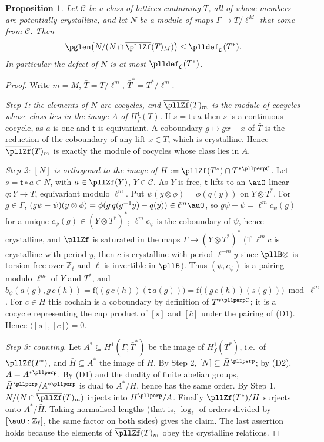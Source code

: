 \documentclass[10pt]{amsart}
\newtheorem{proposition}[theorem]{Proposition}
\theoremstyle{definition}
\theoremstyle{remark}
\newcommand{\Z}{\mathbb Z}
\begin{document}
\begin{proposition}\label{pll:dual}
Let $\mathcal C$ be a class of lattices containing $T$, all of whose members are potentially
crystalline, and let $N$ be a module of maps $\Gamma\to T/\ell^M$ that come from $\mathcal C$. Then
\[
\pglen\bigl(N/(N\cap\overline{\pllZf}(T)_M)\bigr)\le\plldef_{\mathcal C}(T^*).
\]
In particular the defect of $N$ is at most $\plldef_{\mathcal C}(T^*)$.
\end{proposition}

\begin{proof}
Write $m=M$, $\bar T=T/\ell^m$, $\bar T^*=T^*/\ell^m$.

\emph{Step 1: the elements of $N$ are cocycles, and $\overline{\pllZf}(T)_m$ is the module of
cocycles whose class lies in the image $A$ of $H^1_f(T)$.} If $s=\mathsf t\circ a$ then $s$ is a continuous cocycle, as $a$ is one and $\mathsf t$ is equivariant. A coboundary
$g\mapsto g\bar x-\bar x$ of $\bar T$ is the reduction of the coboundary of any lift $x\in T$,
which is crystalline. Hence $\overline{\pllZf}(T)_m$ is exactly the module of cocycles whose class
lies in $A$.

\emph{Step 2: $[N]$ is orthogonal to the image of $H:=\pllZf(T^*)\cap T^{*\pllperp\mathcal C}$.}
Let $s=\mathsf t\circ a\in N$, with $a\in\pllZf(Y)$, $Y\in\mathcal C$. As $Y$ is free, $\mathsf t$
lifts to an $\auO$-linear $q\colon Y\to T$, equivariant modulo $\ell^m$. Put
$\psi(y\otimes\phi)=\phi(q(y))$ on $Y\otimes T^*$. For $g\in\Gamma$,
$(g\psi-\psi)(y\otimes\phi)=\phi(g\,q(g^{-1}y)-q(y))\in\ell^m\auO$, so $g\psi-\psi=\ell^m
c_\psi(g)$ for a unique $c_\psi(g)\in(Y\otimes T^*)^*$; $\ell^mc_\psi$ is the coboundary of $\psi$,
hence crystalline, and $\pllZf$ is saturated in the maps $\Gamma\to(Y\otimes T^*)^*$ (if $\ell^mc$
is crystalline with period $y$, then $c$ is crystalline with period $\ell^{-m}y$ since
$\pllB\otimes$ is torsion-free over $\Z_\ell$ and $\ell$ is invertible in $\pllB$). Thus
$(\psi,c_\psi)$ is a pairing modulo $\ell^m$ of $Y$ and $T^*$, and
$b_\psi(a(g),g\,c(h))=\mathrm f\bigl((g\,c(h))(\mathsf t\,a(g))\bigr)=\mathrm f\bigl((g\,c(h))
(s(g))\bigr)\bmod\ell^m$. For $c\in H$ this cochain is a coboundary by definition of
$T^{*\pllperp\mathcal C}$; it is a cocycle representing the cup product of $[s]$ and $[\bar c]$
under the pairing of (D1). Hence $\langle[s],[\bar c]\rangle=0$.

\emph{Step 3: counting.} Let $A^*\subseteq H^1(\Gamma,\bar T^*)$ be the image of $H^1_f(T^*)$,
i.e.\ of $\pllZf(T^*)$, and $\bar H\subseteq A^*$ the image of $H$. By Step 2,
$[N]\subseteq\bar H^{\pllperp}$; by (D2), $A=A^{*\pllperp}$. By (D1) and the duality of finite
abelian groups, $\bar H^{\pllperp}/A^{*\pllperp}$ is dual to $A^*/\bar H$, hence has the same
order. By Step 1, $N/(N\cap\overline{\pllZf}(T)_m)$ injects into $\bar H^\pllperp/A$. Finally
$\pllZf(T^*)/H$ surjects onto $A^*/\bar H$. Taking normalised lengths (that is, $\log_\ell$ of orders divided by $[\auO:\Z_\ell]$, the same factor on both sides) gives the claim. The last
assertion holds because the elements of $\overline{\pllZf}(T)_m$ obey the crystalline relations.
\end{proof}
\end{document}
